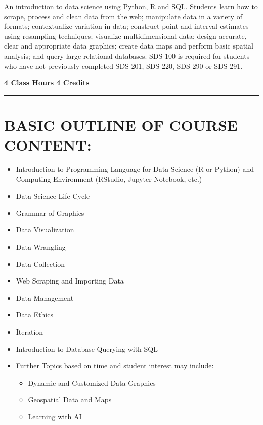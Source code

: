 \documentclass[
  letterpaper,
  DIV=11,
  numbers=noendperiod]{scrartcl}
\begin{document}
An introduction to data science using Python, R and SQL. Students learn
how to scrape, process and clean data from the web; manipulate data in a
variety of formats; contextualize variation in data; construct point and
interval estimates using resampling techniques; visualize
multidimensional data; design accurate, clear and appropriate data
graphics; create data maps and perform basic spatial analysis; and query
large relational databases. SDS 100 is required for students who have
not previously completed SDS 201, SDS 220, SDS 290 or SDS 291.

\textbf{4 Class Hours 4 Credits}

\begin{center}\rule{0.5\linewidth}{0.5pt}\end{center}

\hypertarget{basic-outline-of-course-content}{%
\section{BASIC OUTLINE OF COURSE
CONTENT:}\label{basic-outline-of-course-content}}

\begin{itemize}
\item
  Introduction to Programming Language for Data Science (R or Python)
  and Computing Environment (RStudio, Jupyter Notebook, etc.)
\item
  Data Science Life Cycle
\item
  Grammar of Graphics
\item
  Data Visualization
\item
  Data Wrangling
\item
  Data Collection
\item
  Web Scraping and Importing Data
\item
  Data Management
\item
  Data Ethics
\item
  Iteration
\item
  Introduction to Database Querying with SQL
\item
  Further Topics based on time and student interest may include:

  \begin{itemize}
  \item
    Dynamic and Customized Data Graphics
  \item
    Geospatial Data and Maps
  \item
    Learning with AI
  \end{itemize}
\end{itemize}
\end{document}
